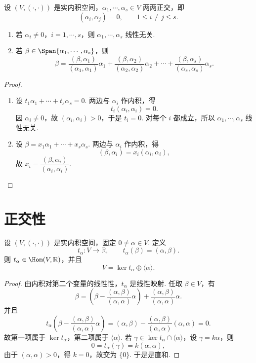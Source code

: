 \begin{example}
	设 $(V,(\cdot,\cdot))$ 是实内积空间，$\alpha_1,\cdots,\alpha_s\in V$ 两两正交，即
	\[
	(\alpha_i,\alpha_j)=0,
	\qquad 1\leqslant i\ne j\leqslant s.
	\]
	\begin{enumerate}
		\item 若 $\alpha_i\ne0$，$i=1,\cdots,s$，则 $\alpha_1,\cdots,\alpha_s$ 线性无关.
		\item 若 $\beta\in \Span\{\alpha_1,\cdots,\alpha_s\}$，则
		\[
		\beta=\frac{(\beta,\alpha_1)}{(\alpha_1,\alpha_1)}\alpha_1+\frac{(\beta,\alpha_2)}{(\alpha_2,\alpha_2)}\alpha_2+\cdots+
		\frac{(\beta,\alpha_s)}{(\alpha_s,\alpha_s)}\alpha_s.
		\]
	\end{enumerate}
\end{example}
\begin{proof}
	\begin{enumerate}
		\item 设 $t_1\alpha_1+\cdots+t_s\alpha_s=0$. 两边与 $\alpha_i$ 作内积，得
		\[
		t_i(\alpha_i,\alpha_i)=0.
		\]
		因 $\alpha_i\ne0$，故 $(\alpha_i,\alpha_i)>0$，于是 $t_i=0$. 对每个 $i$ 都成立，所以 $\alpha_1,\cdots,\alpha_s$ 线性无关.
		\item 设 $\beta=x_1\alpha_1+\cdots+x_s\alpha_s$. 两边与 $\alpha_i$ 作内积，得
		\[
		(\beta,\alpha_i)=x_i(\alpha_i,\alpha_i),
		\]
		故 $x_i=\dfrac{(\beta,\alpha_i)}{(\alpha_i,\alpha_i)}$.
	\end{enumerate}
\end{proof}
\section{正交性}
\begin{example}
	设 $(V,(\cdot,\cdot))$ 是实内积空间，固定 $0\ne\alpha\in V$. 定义
	\[
	t_\alpha:V\longrightarrow\mathbb{R},
	\qquad
	t_\alpha(\beta)=(\alpha,\beta).
	\]
	则 $t_\alpha\in\Hom(V,\mathbb{R})$，并且
	\[
	V=\ker t_\alpha\oplus \langle \alpha\rangle.
	\]
\end{example}
\begin{proof}
	由内积对第二个变量的线性性，$t_\alpha$ 是线性映射. 任取 $\beta\in V$，有
	\[
	\beta=\left(\beta-\frac{(\alpha,\beta)}{(\alpha,\alpha)}\alpha\right)
	+
	\frac{(\alpha,\beta)}{(\alpha,\alpha)}\alpha.
	\]
	并且
	\[
	t_\alpha\left(\beta-\frac{(\alpha,\beta)}{(\alpha,\alpha)}\alpha\right)
	=(\alpha,\beta)-\frac{(\alpha,\beta)}{(\alpha,\alpha)}(\alpha,\alpha)=0.
	\]
	故第一项属于 $\ker t_\alpha$，第二项属于 $\langle \alpha\rangle$. 若 $\gamma\in\ker t_\alpha\cap\langle \alpha\rangle$，设 $\gamma=k\alpha$，则
	\[
	0=t_\alpha(\gamma)=k(\alpha,\alpha),
	\]
	由于 $(\alpha,\alpha)>0$，得 $k=0$，故交为 $\{0\}$. 于是是直和.
\end{proof}


